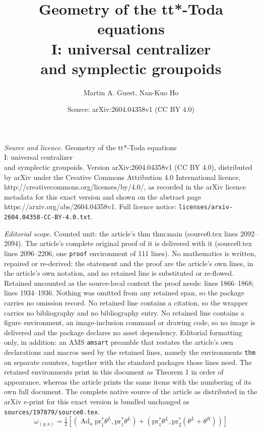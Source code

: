 \documentclass[10pt,a4paper]{amsart}
\title{Geometry of the tt*-Toda equations \\ I: universal centralizer \\ and symplectic groupoids}
\author{Martin A. Guest, Nan-Kuo Ho}
\date{Source: arXiv:2604.04358v1 (CC BY 4.0)}
\DeclareMathOperator{\Ad}{Ad}
\newcommand{\pr}{\mathrm{pr}}
\begin{document}
\maketitle

\noindent\emph{Source and licence.} Geometry of the tt*-Toda equations \\ I: universal centralizer \\ and symplectic groupoids. Version arXiv:2604.04358v1 (CC BY 4.0), distributed by arXiv under the Creative Commons Attribution 4.0 International licence, http://creativecommons.org/licenses/by/4.0/, as recorded in the arXiv licence metadata for this exact version and shown on the abstract page https://arxiv.org/abs/2604.04358v1. Full licence notice: \texttt{licenses/arxiv-2604.04358-CC-BY-4.0.txt}.\par\smallskip

\noindent\textit{Editorial scope.} Counted unit: the article's thm thm:main (source0.tex lines 2092--2094). The article's complete original proof of it is delivered with it (source0.tex lines 2096--2206, one \texttt{proof} environment of 111 lines). No mathematics is written, repaired or re-derived: the statement and the proof are the article's own lines, in the article's own notation, and no retained line is substituted or re-flowed.  Retained uncounted as the source-local context the proof needs: lines 1866--1868; lines 1934--1936.  Nothing was omitted from any retained span, so the package carries no omission record.  No retained line contains a citation, so the wrapper carries no bibliography and no bibliography entry.  No retained line contains a figure environment, an image-inclusion command or drawing code, so no image is delivered and the package declares no asset dependency.  Editorial formatting only, in addition: an AMS \texttt{amsart} preamble that restates the article's own declarations and macros used by the retained lines, namely the environments \texttt{thm} on separate counters, together with the standard packages those lines need.  The retained environments print in this document as Theorem 1 in order of appearance, whereas the article prints the same items with the numbering of its own full document.  The complete native source of the article as distributed in the arXiv e-print for this exact version is bundled unchanged as \texttt{sources/197879/source0.tex}.
\begin{equation}\label{eq:quasi2form}
\omega_{(g,a)}=\tfrac{1}{2}[(\Ad_a\pr_1^*\theta^L,\pr_1^*\theta^L)+(\pr_1^*\theta^L,\pr^*_2(\theta^L+\theta^R))]
\end{equation}
\end{document}
